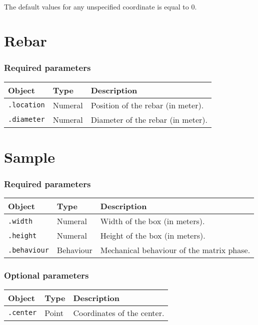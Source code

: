 \documentclass[10pt]{article}
\begin{document}
\paragraph{} The default values for any unspecified coordinate is equal to 0.


\section{Rebar}

\subsubsection*{Required parameters}

\begin{tabularx}{\textwidth}{llX}
\hline 
Object & Type & Description \\ 
\hline 
\verb+.location+ & Numeral & Position of the rebar (in meter). \\ 
\verb+.diameter+ & Numeral & Diameter of the rebar (in meter).\\
\hline 
\end{tabularx}

\section{Sample}

\subsubsection*{Required parameters}

\begin{tabularx}{\textwidth}{llX}
\hline 
Object & Type & Description \\ 
\hline 
\verb+.width+ & Numeral & Width of the box (in meters). \\ 
\verb+.height+ & Numeral & Height of the box (in meters). \\ 
\verb+.behaviour+ & Behaviour & Mechanical behaviour of the matrix phase. \\ 
\hline 
\end{tabularx}

\subsubsection*{Optional parameters}

\begin{tabularx}{\textwidth}{llX}
\hline 
Object & Type & Description \\ 
\hline 
\verb+.center+ & Point & Coordinates of the center. \\ 
\hline 
\end{tabularx} 
\end{document}
